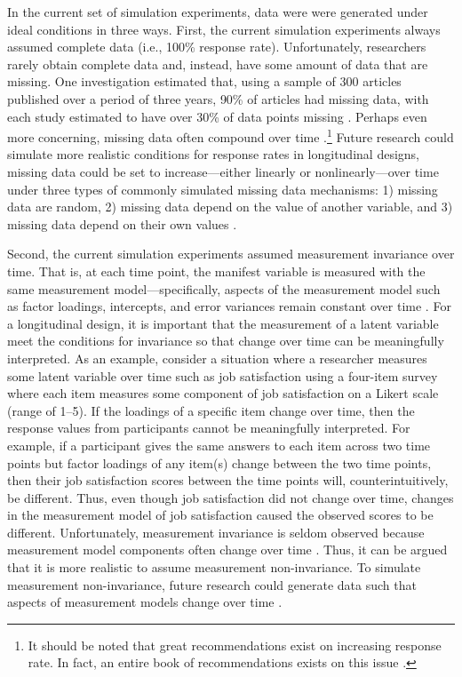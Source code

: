 \documentclass[
12pt, %
twoside,
english]{guelphthesis}
\begin{document}
In the current set of simulation experiments, data were were generated under ideal conditions in three ways. First, the current simulation experiments always assumed complete data (i.e., 100\% response rate). Unfortunately, researchers rarely obtain complete data and, instead, have some amount of data that are missing. One investigation estimated that, using a sample of 300 articles published over a period of three years, 90\% of articles had missing data, with each study estimated to have over 30\% of data points missing \autocite[Chapter 1]{mcknight2007}. Perhaps even more concerning, missing data often compound over time \autocite{newman2003}.\footnote{It should be noted that great recommendations exist on increasing response rate. In fact, an entire book of recommendations exists on this issue \parencite[see][]{dillman2014}.} Future research could simulate more realistic conditions for response rates in longitudinal designs, missing data could be set to increase---either linearly or nonlinearly---over time under three types of commonly simulated missing data mechanisms: 1) missing data are random, 2) missing data depend on the value of another variable, and 3) missing data depend on their own values \autocite{newman2009}.

Second, the current simulation experiments assumed measurement invariance over time. That is, at each time point, the manifest variable is measured with the same measurement model---specifically, aspects of the measurement model such as factor loadings, intercepts, and error variances remain constant over time \autocite{mellenbergh1989,vandenberg2000}. For a longitudinal design, it is important that the measurement of a latent variable meet the conditions for invariance so that change over time can be meaningfully interpreted. As an example, consider a situation where a researcher measures some latent variable over time such as job satisfaction using a four-item survey where each item measures some component of job satisfaction on a Likert scale (range of 1--5). If the loadings of a specific item change over time, then the response values from participants cannot be meaningfully interpreted. For example, if a participant gives the same answers to each item across two time points but factor loadings of any item(s) change between the two time points, then their job satisfaction scores between the time points will, counterintuitively, be different. Thus, even though job satisfaction did not change over time, changes in the measurement model of job satisfaction caused the observed scores to be different. Unfortunately, measurement invariance is seldom observed \autocite{vandenberg2000,vandeschoot2015} because measurement model components often change over time \autocite[e.g.,][]{fried2016}. Thus, it can be argued that it is more realistic to assume measurement non-invariance. To simulate measurement non-invariance, future research could generate data such that aspects of measurement models change over time \autocite[e.g.,][]{kim2014a}.
\end{document}
